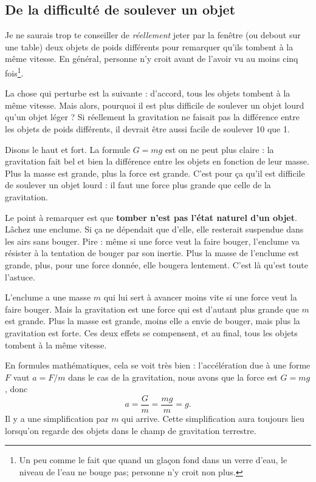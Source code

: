 \documentclass[a4paper,12pt]{book}
\theoremstyle{mes_exemples}	\newtheorem{exemple}[numtho]{Exemple}
\theoremstyle{mes_tho}
\begin{document}
\subsection{De la difficulté de soulever un objet}

Je ne saurais trop te conseiller de \emph{réellement} jeter par la fenêtre (ou debout sur une table) deux objets de poids différents pour remarquer qu'ils tombent à la même vitesse. En général, personne n'y croit avant de l'avoir vu au moins cinq fois\footnote{Un peu comme le fait que quand un glaçon fond dans un verre d'eau, le niveau de l'eau ne bouge pas; personne n'y croit non plus.}. 

La chose qui perturbe est la suivante : d'accord, tous les objets tombent à la même vitesse. Mais alors, pourquoi il est plus difficile de soulever un objet lourd qu'un objet léger ? Si réellement la gravitation ne faisait pas la différence entre les objets de poids différents, il devrait être aussi facile de soulever \unit{10}{\kilo\gram} que \unit{1}{\kilo\gram}.

Disons le haut et fort. La formule $G=mg$ est on ne peut plus claire : la gravitation fait bel et bien la différence entre les objets en fonction de leur masse. Plus la masse est grande, plus la force est grande. C'est pour ça qu'il est difficile de soulever un objet lourd : il faut une force plus grande que celle de la gravitation.

Le point à remarquer est que {\bf tomber n'est pas l'état \og naturel\fg{} d'un objet}. Lâchez une enclume. Si ça ne dépendait que d'elle, elle resterait suspendue dans les airs sans bouger. Pire : même si une force veut la faire bouger, l'enclume va résister à la tentation de bouger par son inertie. Plus la masse de l'enclume est grande, plus, pour une force donnée, elle bougera lentement. C'est là qu'est toute l'astuce.

L'enclume a une masse $m$ qui lui sert à avancer moins vite si une force veut la faire bouger. Mais la gravitation est une force qui est d'autant plus grande que $m$ est grande. Plus la masse est grande, moins elle a envie de bouger, mais plus la gravitation est forte. Ces deux effets se compensent, et au final, tous les objets tombent à la même vitesse.

En formules mathématiques, cela se voit très bien : l'accélération due à une forme $F$ vaut $a=F/m$ dans le cas de la gravitation, nous avons que la force est $G=mg$, donc
\begin{equation}
	a=\frac{ G }{ m }=\frac{ mg }{ m }=g.
\end{equation}
Il y a une simplification par $m$ qui arrive. Cette simplification aura toujours lieu lorsqu'on regarde des objets dans le champ de gravitation terrestre.
\end{document}
